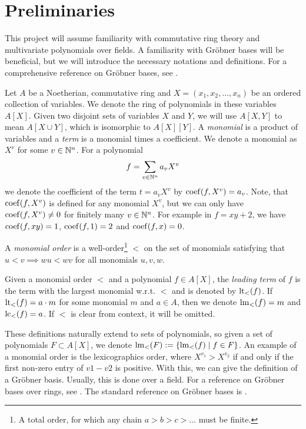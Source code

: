 \section{Preliminaries}
This project will assume familiarity with commutative ring theory and multivariate polynomials over fields. A familiarity with Gröbner bases will be beneficial, but we will introduce the necessary notations and definitions. For a comprehensive reference on Gröbner bases, see \cite{IVA}.

Let $A$ be a Noetherian, commutative ring and $X = (x_{1}, x_{2}, \dots, x_{n})$ be an ordered collection of variables. We denote the ring of polynomials in these variables $A[X]$. Given two disjoint sets of variables $X$ and $Y$, we will use $A[X, Y]$ to mean $A[X \cup Y]$, which is isomorphic to $A[X][Y]$. A \textit{monomial} is a product of variables and a \textit{term} is a monomial times a coefficient. We denote a monomial as $X^{v}$ for some $v \in \mathbb{N}^{n}$. For a polynomial \[f = \sum_{v \in \mathbb{N}^{n}} a_{v}X^{v}\] we denote the coefficient of the term $t = a_{v}X^{v}$ by $\operatorname{coef}(f, X^{v}) = a_{v}$. Note, that $\operatorname{coef}(f, X^{v})$ is defined for any monomial $X^{v}$, but we can only have $\operatorname{coef}(f, X^{v}) \neq 0$ for finitely many $v \in \mathbb{N}^{n}$. For example in $f = xy + 2$, we have $\operatorname{coef}(f, xy) = 1$, $\operatorname{coef}(f, 1) = 2$ and $\operatorname{coef}(f, x) = 0$.

\begin{definition}
  A \textit{monomial order} is a well-order\footnote{A total order, for which any chain $a > b > c > \dots$ must be finite.} $<$ on the set of monomials satisfying that $u < v \implies wu < wv$ for all monomials $u, v, w$.

  Given a monomial order $<$ and a polynomial $f \in A[X]$, the \textit{leading term} of $f$ is the term with the largest monomial w.r.t. $<$ and is denoted by $\operatorname{lt}_{<}(f)$. If $\operatorname{lt}_{<}(f) = a\cdot m$ for some monomial $m$ and $a \in A$, then we denote $\operatorname{lm}_{<}(f) = m$ and $\operatorname{lc}_{<}(f) = a$. If $<$ is clear from context, it will be omitted.
\end{definition}

These definitions naturally extend to sets of polynomials, so given a set of polynomials $F \subset A[X]$, we denote $\operatorname{lm}_{<}(F) := \{\operatorname{lm}_{<}(f) \mid f \in F\}$. An example of a monomial order is the lexicographics order, where $X^{v_{1}} > X^{v_{2}}$ if and only if the first non-zero entry of $v1 - v2$ is positive. With this, we can give the definition of a Gröbner basis. Usually, this is done over a field. For a reference on Gröbner bases over rings, see \cite{loustaunau1994introduction}. The standard reference on Gröbner bases is \cite{IVA}.

